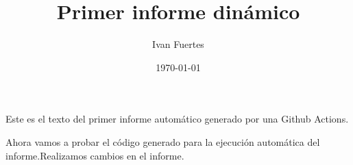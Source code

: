 \documentclass[12pt, a4paper]{book}
\title{Primer informe dinámico}
\author{Ivan Fuertes}
\date{\today}
\begin{document}
\maketitle

Este es el texto del primer informe automático generado por una Github Actions.\newline

Ahora vamos a probar el código generado para la ejecución automática del informe.Realizamos cambios en el informe.
\end{document}
